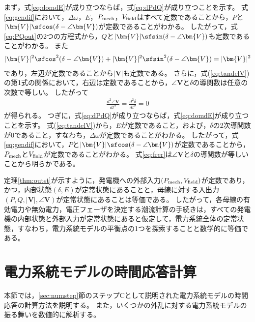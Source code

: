 \documentclass[tombow,dvipdfmx]{corona-a5-1.1}
\begin{document}
\begin{証明}
まず，式\ref{eq:domdE}が成り立つならば，式\ref{eq:dPdQ}が成り立つことを示す。
式\ref{eq:gendif}において，$\Delta \omega$，$E$，$P_{\rm mech}$，$V_{\rm field}$はすべて定数であることから，$P$と$|\bm{V}|\sfcos (\delta - \angle \bm{V})$が定数であることがわかる。
したがって，式\ref{eq:PQout}の2つの方程式から，$Q$と$|\bm{V}|\sfsin (\delta - \angle \bm{V})$も定数であることがわかる。
また
\begin{align*}
|\bm{V}|^2\sfcos^2 (\delta - \angle \bm{V}) +
|\bm{V}|^2\sfsin^2 (\delta - \angle \bm{V}) = |\bm{V}|^2
\end{align*}
であり，左辺が定数であることから$|\bm{V}|$も定数である。
さらに，式(\ref{eq:tandelV})の第1式の関係において，右辺は定数であることから，$\angle \bm{V}$と$\delta$の導関数は任意の次数で等しい。
したがって
\begin{align*}
\frac{d^2 \angle \bm{V}}{dt^2} = \frac{d^2 \delta}{dt^2} =0
\end{align*}
が得られる。
つぎに，式\ref{eq:dPdQ}が成り立つならば，式\ref{eq:domdE}が成り立つことを示す。
式(\ref{eq:tandelV})から，$E$が定数であること，および，$\delta$の2次導関数が$0$であること，すなわち，$\Delta \omega$が定数であることがわかる。
したがって，式\ref{eq:gendif}において，$P$と$|\bm{V}|\sfcos (\delta - \angle \bm{V})$が定数であることから，$P_{\rm mech}$と$V_{\rm field}$が定数であることがわかる。
式\ref{eq:frer}は$\angle \bm{V}$と$\delta$の導関数が等しいことから明らかである。
\end{証明}

定理\ref{thm:outst}が示すように，発電機への外部入力$(P_{\rm mech},V_{\rm field})$が定数であり，かつ，内部状態$(\delta,E)$が定常状態にあることと，母線に対する入出力$(P,Q,|\bm{V}|,\angle \bm{V})$が定常状態にあることは等価である。
したがって，各母線の有効電力や無効電力，電圧フェーザを決定する潮流計算の手続きは，すべての発電機の内部状態と外部入力が定常状態にあると仮定して，電力系統全体の定常状態，すなわち，電力系統モデルの平衡点の1つを探索することと数学的に等価である。



\section{電力系統モデルの時間応答計算}\label{sec:numsimtr}

本節では，\ref{sec:numstep}節のステップCとして説明された電力系統モデルの時間応答の計算方法を説明する。
また，いくつかの外乱に対する電力系統モデルの振る舞いを数値的に解析する。
\end{document}

